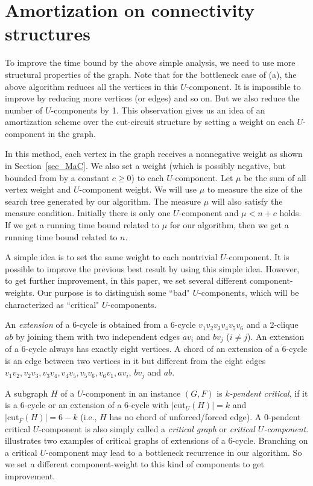 \documentclass[runningheads]{llncs}
\begin{document}
\section{Amortization on connectivity structures}
To improve the time bound by the above simple analysis, we need to use more structural properties of the graph.
Note that for the bottleneck case of (a), the above algorithm reduces all the vertices in this $U$-component. It is impossible to improve by reducing more vertices (or edges) and so on. But we also reduce the number of $U$-components by 1. This observation gives us an idea of an amortization scheme over the cut-circuit structure by setting a weight on each $U$-component in the graph.

In this method, each vertex in the graph receives a nonnegative weight as shown in Section~\ref{sec_MaC}. We also set a  weight (which is possibly negative, but bounded from by a constant $c\geq 0$) to each $U$-component. Let $\mu$ be the sum of all vertex weight and $U$-component weight. We will use $\mu$ to measure the size of the search tree generated by our algorithm.  The measure $\mu$ will also satisfy the measure condition. Initially there is only one $U$-component and $\mu< n+c$ holds.
If we get a running time bound related to $\mu$ for our algorithm, then we get a running time bound related to $n$.

A simple idea is to set the same weight to each nontrivial $U$-component.  It is possible to improve the previous best result by using this simple idea. However, to get further improvement, in this paper, we set several different component-weights. Our purpose is to distinguish some ``bad" $U$-components, which will be characterized as  ``critical" $U$-components.

An {\em extension} of a 6-cycle is obtained from a 6-cycle $v_1v_2v_3v_4v_5v_6$ and a 2-clique $ab$
by joining them with two independent edges $av_i$ and $bv_j$ ($i\neq j$).
An extension of a 6-cycle always has exactly eight vertices.
A chord of an extension of a 6-cycle is an edge between two vertices in it but different from the eight edges
$v_1v_2,v_2v_3,v_3v_4,v_4v_5,v_5v_6,v_6v_1,av_i$, $bv_j$ and $ab$.


A subgraph $H$ of a $U$-component in an instance $(G,F)$ is \emph{$k$-pendent critical}, if it is a 6-cycle or an extension of a 6-cycle with
$|\mathrm{cut}_U(H)|=k$ and $|\mathrm{cut}_F(H)|=6-k$
(i.e., $H$ has no chord of unforced/forced edge). A $0$-pendent critical $U$-component is also simply called a \emph{critical graph} or \emph{critical $U$-component}.
 illustrates two examples of critical graphs of extensions of a $6$-cycle.
Branching on a critical $U$-component may lead to a bottleneck recurrence in our algorithm.
So we set a different component-weight to this kind of components to get improvement.
\end{document}
